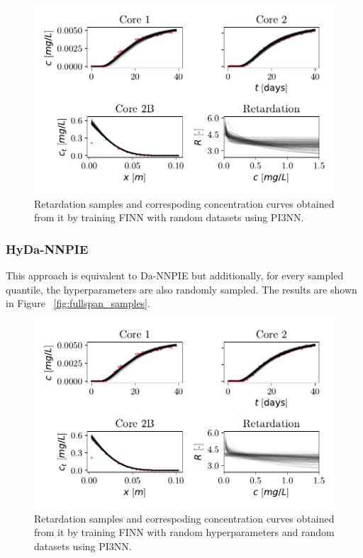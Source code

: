\begin{figure}[h]
    \centering
    \includegraphics{figs/finn_dataspan_samples.pdf}
    \caption{Retardation samples and correspoding concentration curves obtained from it by training FINN with random datasets using PI3NN.}
    \label{fig:dataspan_samples}
\end{figure}



\subsubsection{HyDa-NNPIE}
This approach is equivalent to Da-NNPIE but additionally, for every sampled quantile, the hyperparameters are also randomly sampled. The results are shown in Figure ~\vref{fig:fullspan_samples}.

\begin{figure}[h]
    \centering
    \includegraphics{figs/finn_fullspan_samples.pdf}
    \caption{Retardation samples and correspoding concentration curves obtained from it by training FINN with random hyperparameters and random datasets using PI3NN.}
    \label{fig:fullspan_samples}
\end{figure}



